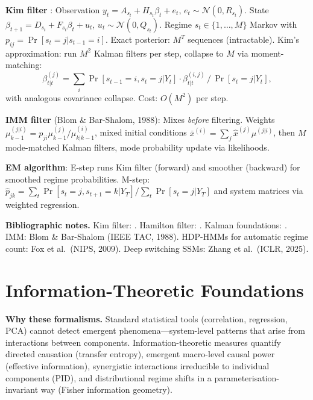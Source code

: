 \documentclass[11pt,a4paper]{article}
\theoremstyle{definition}
\begin{document}
\begin{appendices}
\textbf{Kim filter} \citep{kim1999state}: Observation $y_t = A_{s_t} + H_{s_t}\beta_t + e_t$, $e_t \sim \mathcal{N}(0, R_{s_t})$. State $\beta_{t+1} = D_{s_t} + F_{s_t}\beta_t + u_t$, $u_t \sim \mathcal{N}(0, Q_{s_t})$. Regime $s_t \in \{1,\ldots,M\}$ Markov with $p_{ij} = \Pr[s_t = j|s_{t-1}=i]$. Exact posterior: $M^T$ sequences (intractable). Kim's approximation: run $M^2$ Kalman filters per step, collapse to $M$ via moment-matching:
\begin{equation}
  \beta^{(j)}_{t|t} = \sum_i \Pr[s_{t-1}{=}i, s_t{=}j|Y_t] \cdot \beta^{(i,j)}_{t|t}\, /\, \Pr[s_t{=}j|Y_t],
\end{equation}
with analogous covariance collapse. Cost: $O(M^2)$ per step.

\textbf{IMM filter} (Blom \& Bar-Shalom, 1988): Mixes \emph{before} filtering. Weights $\mu^{(j|i)}_{k-1} = p_{ji}\mu^{(j)}_{k-1}/\mu^{(i)}_{k|k-1}$, mixed initial conditions $\bar{x}^{(i)} = \sum_j \hat{x}^{(j)}\mu^{(j|i)}$, then $M$ mode-matched Kalman filters, mode probability update via likelihoods.

\textbf{EM algorithm}: E-step runs Kim filter (forward) and smoother (backward) for smoothed regime probabilities. M-step: $\hat{p}_{jk} = \sum_t \Pr[s_t{=}j, s_{t+1}{=}k|Y_T]/\sum_t \Pr[s_t{=}j|Y_T]$ and system matrices via weighted regression.

\textbf{Bibliographic notes.} Kim filter: \citet{kim1999state}. Hamilton filter: \citet{hamilton1989new}. Kalman foundations: \citet{durbin2012time}. IMM: Blom \& Bar-Shalom (IEEE TAC, 1988). HDP-HMMs for automatic regime count: Fox et al.\ (NIPS, 2009). Deep switching SSMs: Zhang et al.\ (ICLR, 2025).


\section{Information-Theoretic Foundations}
\label{app:info_theory}

\textbf{Why these formalisms.} Standard statistical tools (correlation, regression, PCA) cannot detect emergent phenomena---system-level patterns that arise from interactions between components. Information-theoretic measures quantify directed causation (transfer entropy), emergent macro-level causal power (effective information), synergistic interactions irreducible to individual components (PID), and distributional regime shifts in a parameterisation-invariant way (Fisher information geometry).


\end{appendices}
\end{document}
